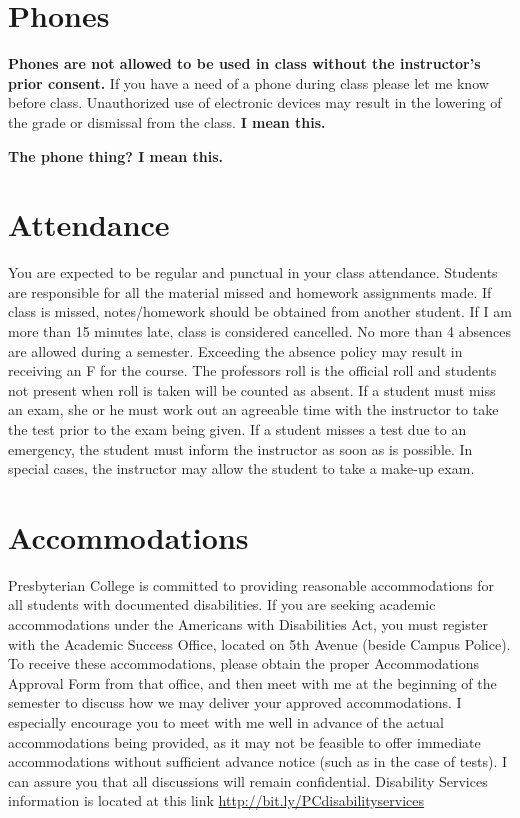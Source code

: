 \documentclass[
]{book}
\begin{document}
\hypertarget{phones}{%
\section{Phones}\label{phones}}

\textbf{Phones are not allowed to be used in class without the instructor's prior consent.} If you have a need of a phone during class please let me know before class. Unauthorized use of electronic devices may result in the lowering of the grade or dismissal from the class. \textbf{I mean this.}

\textbf{The phone thing? I mean this.}

\hypertarget{attendance}{%
\section{Attendance}\label{attendance}}

You are expected to be regular and punctual in your class attendance. Students are responsible for all the material missed and homework assignments made. If class is missed, notes/homework should be obtained from another student. If I am more than 15 minutes late, class is considered cancelled. No more than 4 absences are allowed during a semester. Exceeding the absence policy may result in receiving an F for the course. The professors roll is the official roll and students not present when roll is taken will be counted as absent. If a student must miss an exam, she or he must work out an agreeable time with the instructor to take the test prior to the exam being given. If a student misses a test due to an emergency, the student must inform the instructor as soon as is possible. In special cases, the instructor may allow the student to take a make-up exam.

\hypertarget{accommodations}{%
\section{Accommodations}\label{accommodations}}

Presbyterian College is committed to providing reasonable accommodations for all students with documented disabilities. If you are seeking academic accommodations under the Americans with Disabilities Act, you must register with the Academic Success Office, located on 5th Avenue (beside Campus Police). To receive these accommodations, please obtain the proper Accommodations Approval Form from that office, and then meet with me at the beginning of the semester to discuss how we may deliver your approved accommodations. I especially encourage you to meet with me well in advance of the actual accommodations being provided, as it may not be feasible to offer immediate accommodations without sufficient advance notice (such as in the case of tests). I can assure you that all discussions will remain confidential. Disability Services information is located at this link \url{http://bit.ly/PCdisabilityservices}
\end{document}
